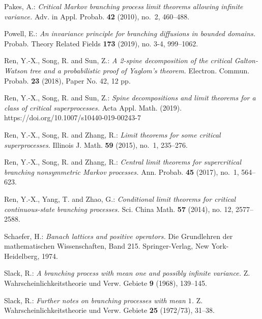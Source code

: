 \documentclass[12pt,a4paper]{amsart}
\theoremstyle{definition}
\numberwithin{equation}{section}
\begin{document}
\begin{thebibliography}{10}
	
	Pakes, A.:
	\emph{Critical {M}arkov branching process limit theorems allowing infinite variance.}
	Adv. in Appl. Probab. \textbf{42} (2010), no.~2, 460--488.
	
	
  Powell, E.:
  \emph{An invariance principle for branching diffusions in bounded domains.}
  Probab. Theory Related Fields  \textbf{173} (2019), no. 3-4, 999–1062.

	
	
  Ren, Y.-X., Song, R. and Sun, Z.:
  \emph{A 2-spine decomposition of the critical Galton-Watson tree and a probabilistic proof of Yaglom's theorem.}
  Electron. Commun. Probab. \textbf{23} (2018), Paper No. 42, 12 pp.

	
	
  Ren, Y.-X., Song, R. and Sun, Z.:
  \emph{Spine decompositions and limit theorems for a class of critical superprocesses.}
  Acta Appl. Math. (2019). https://doi.org/10.1007/s10440-019-00243-7

	
	
	Ren, Y.-X., Song, R. and Zhang, R.:
  \emph{Limit theorems for some critical superprocesses.}
	Illinois J. Math. \textbf{59} (2015), no.~1, 235--276.

	
	Ren, Y.-X., Song, R. and Zhang, R.:
	\emph{Central limit theorems for supercritical branching nonsymmetric {M}arkov processes.}
	Ann. Probab. \textbf{45} (2017), no.~1, 564--623.
	
	
	Ren, Y.-X., Yang, T. and Zhao, G.:
	\emph{Conditional limit theorems for critical continuous-state branching processes.}
	Sci. China Math. \textbf{57} (2014), no. 12, 2577–2588.
	
	
	Schaefer, H.:
	\emph{Banach lattices and positive operators.}
	Die Grundlehren der mathematischen Wissenschaften, Band 215. Springer-Verlag, New York-Heidelberg, 1974.
	
	Slack, R.:
	\emph{A branching process with mean one and possibly infinite variance.}
	Z. Wahrscheinlichkeitstheorie und Verw. Gebiete \textbf{9} (1968), 139--145.

	
	Slack, R.:
  \emph{Further notes on branching processes with mean {$1$}.}
	Z. Wahrscheinlichkeitstheorie und Verw. Gebiete \textbf{25} (1972/73), 31–38.


\end{thebibliography}
\end{document}
